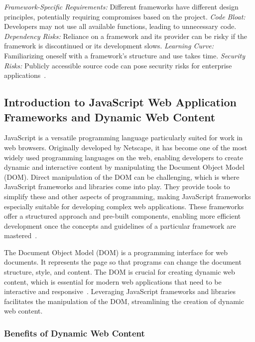 \documentclass[conference]{IEEEtran}
\begin{document}
\textit{Framework-Specific Requirements:} Different frameworks have different design principles, potentially requiring compromises based on the project.
\newline\textit{Code Bloat:} Developers may not use all available functions, leading to unnecessary code.
\newline\textit{Dependency Risks:} Reliance on a framework and its provider can be risky if the framework is discontinued or its development slows.
\newline\textit{Learning Curve:} Familiarizing oneself with a framework’s structure and use takes time.
\newline\textit{Security Risks:} Publicly accessible source code can pose security risks for enterprise applications~\cite{ionos_webframeworks}.

\subsection{Introduction to JavaScript Web Application Frameworks and Dynamic Web Content}

JavaScript is a versatile programming language particularly suited for work in web browsers. Originally developed by Netscape, it has become one of the most widely used programming languages on the web, enabling developers to create dynamic and interactive content by manipulating the Document Object Model (DOM). Direct manipulation of the DOM can be challenging, which is where JavaScript frameworks and libraries come into play. They provide tools to simplify these and other aspects of programming, making JavaScript frameworks especially suitable for developing complex web applications. These frameworks offer a structured approach and pre-built components, enabling more efficient development once the concepts and guidelines of a particular framework are mastered~\cite{ionos_jsframeworks}.

The Document Object Model (DOM) is a programming interface for web documents. It represents the page so that programs can change the document structure, style, and content. The DOM is crucial for creating dynamic web content, which is essential for modern web applications that need to be interactive and responsive~\cite{mdn_dom}. Leveraging JavaScript frameworks and libraries facilitates the manipulation of the DOM, streamlining the creation of dynamic web content.

\subsubsection{Benefits of Dynamic Web Content}
\end{document}

